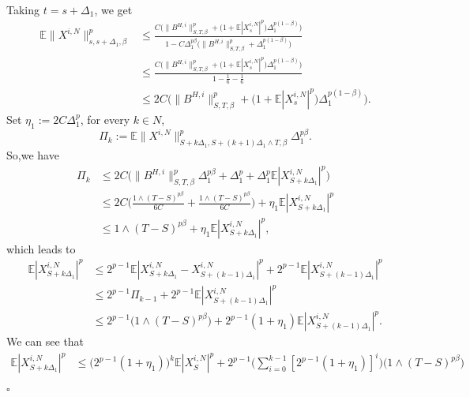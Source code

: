 \documentclass[12pt]{article}
\def\E{\mathbb E}
\newenvironment{proof}{{\noindent\it Proof.}\ }{\hfill $\square$\par}
\numberwithin{equation}{section}
\begin{document}
\begin{proof}
\begin{equation}
		\end{equation}
		Taking $t = s + \Delta_1$, we get
		\begin{equation}
			\begin{aligned}
				\E\|X^{i,N}\|^p_{s,s + \Delta_1,\beta}
				&\leq\frac{C\Big(\|B^{H,i}\|^p_{S,T,\beta}+\big(1+\E|X^{i,N}_s|^p\big)\Delta_1^{p(1-\beta)}\Big) }{1-C\Delta_1^{p\beta}\Big(\|B^{H,i}\|^p_{S,T,\beta}+\Delta_1^{p(1-\beta)}\Big)}\\
				&\leq\frac{C\Big(\|B^{H,i}\|^p_{S,T,\beta}+\big(1+\E|X^{i,N}_s|^p\big)\Delta_1^{p(1-\beta)}\Big) }{1-\frac{1}{6}-\frac{1}{6}}\\
				&\leq 2C\Big(\|B^{H,i}\|^p_{S,T,\beta}+\big(1+\E|X^{i,N}_s|^p\big)\Delta_1^{p(1-\beta)}\Big).
			\end{aligned}
		\end{equation}
		Set $\eta_1:=2C\Delta_1^p$, for every $k\in N$,
		\begin{equation}
			\Pi_k:=\E\|X^{i,N}\|^p_{S+k\Delta_1,S+(k+1)\Delta_1\wedge T,\beta}\Delta_1^{p\beta}.
		\end{equation}
		So,we have
		\begin{equation}\label{eq-4.18}
			\begin{aligned}
				\Pi_k&\leq 2C\Big(\|B^{H,i}\|^p_{S,T,\beta}\Delta_1^{p\beta}+\Delta_1^p+\Delta_1^{p}\E|X^{i,N}_{S+k\Delta_1}|^p\Big)\\
				&\leq 2C\Big(\frac{1\wedge (T-S)^{p\beta}}{6C}+\frac{1\wedge (T-S)^{p\beta}}{6C}\Big)+\eta_1\E|X^{i,N}_{S+k\Delta_1}|^p\\
				&\leq 1\wedge (T-S)^{p\beta}+\eta_1\E|X^{i,N}_{S+k\Delta_1}|^p,
			\end{aligned}
		\end{equation}
		which leads to
		\begin{equation}\label{eq-4.19}
			\begin{aligned}
				\E|X^{i,N}_{S+k\Delta_1}|^p&\leq 2^{p-1}\E|X^{i,N}_{S+k\Delta_1}-X^{i,N}_{S+(k-1)\Delta_1}|^p+2^{p-1}\E|X^{i,N}_{S+(k-1)\Delta_1}|^p\\
				&\leq 2^{p-1}\Pi_{k-1}+2^{p-1}\E|X^{i,N}_{S+(k-1)\Delta_1}|^p\\
				&\leq 2^{p-1}\big(1\wedge (T-S)^{p\beta} \big)+2^{p-1}(1+\eta_1)\E|X^{i,N}_{S+(k-1)\Delta_1}|^p.
			\end{aligned}
		\end{equation}
		We can see that
		\begin{equation}
			\begin{aligned}
				\E|X^{i,N}_{S+k\Delta_1}|^p&\leq \big(2^{p-1}(1+\eta_1)\big)^k\E|X^{i,N}_S|^p+2^{p-1}\Big(\sum_{i=0}^{k-1}[2^{p-1}(1+\eta_1)]^i\Big)\big(1\wedge (T-S)^{p\beta} \big)\\

\end{aligned}
\end{equation}
\end{proof}
\end{document}
